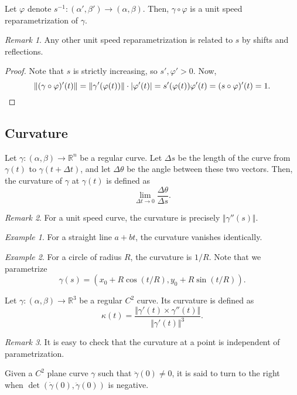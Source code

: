 \documentclass[11pt]{article}
\newcommand{\R}{\mathbb{R}}
\newcommand{\norm}[1]{\Vert #1 \Vert}
\theoremstyle{definition}
\theoremstyle{remark}
\newtheorem*{remark}{Remark}
\newtheorem*{example}{Example}
\numberwithin{equation}{section}
\begin{document}
    \begin{lemma}
        Let $\varphi$ denote $s^{-1}\colon (\alpha', \beta') \to (\alpha, \beta)$.
        Then, $\gamma\circ \varphi$ is a unit speed reparametrization of $\gamma$.

        \begin{remark}
            Any other unit speed reparametrization is related to $s$ by shifts and
            reflections.
        \end{remark}
    \end{lemma}
    \begin{proof}
        Note that $s$ is strictly increasing, so $s', \varphi' > 0$. Now, \[
            \norm{(\gamma\circ \varphi)'(t)} = \norm{\gamma'(\varphi(t))}\cdot
            |\varphi'(t)| = s'(\varphi(t))\varphi'(t) = (s\circ \varphi)'(t) = 1. \qedhere
        \] 
    \end{proof}


    \subsection{Curvature}
    
    \begin{definition}
        Let $\gamma\colon (\alpha, \beta) \to \R^n$ be a regular curve. Let $\Delta
        s$ be the length of the curve from $\gamma(t)$ to $\gamma(t + \Delta t)$, and
        let $\Delta\theta$ be the angle between these two vectors. Then, the
        curvature of $\gamma$ at $\gamma(t)$ is defined as \[
            \lim_{\Delta t \to 0} \frac{\Delta\theta}{\Delta s}.
        \] \begin{remark}
            For a unit speed curve, the curvature is precisely $\norm{\gamma''(s)}$.
        \end{remark}
    \end{definition}
    \begin{example}
        For a straight line $a + bt$, the curvature vanishes identically.
    \end{example}
    \begin{example}
        For a circle of radius $R$, the curvature is $1 / R$. Note that we
        parametrize \[
            \gamma(s) = (x_0 + R\cos(t / R), y_0 + R\sin(t / R)).
        \] 
    \end{example}

    \begin{definition}
        Let $\gamma\colon (\alpha, \beta) \to \R^3$ be a regular $C^2$ curve. Its
        curvature is defined as \[
            \kappa(t) = \frac{\norm{\gamma'(t) \times
            \gamma''(t)}}{\norm{\gamma'(t)}^3}.
        \] 
        \begin{remark}
            It is easy to check that the curvature at a point is independent of
            parametrization.
        \end{remark}
    \end{definition}

    \begin{definition}
        Given a $C^2$ plane curve $\gamma$ such that $\ddot{\gamma}(0) \neq 0$, it is
        said to turn to the right when $\det(\dot{\gamma}(0), \ddot{\gamma}(0))$ is
        negative.
    \end{definition}
\end{document}
